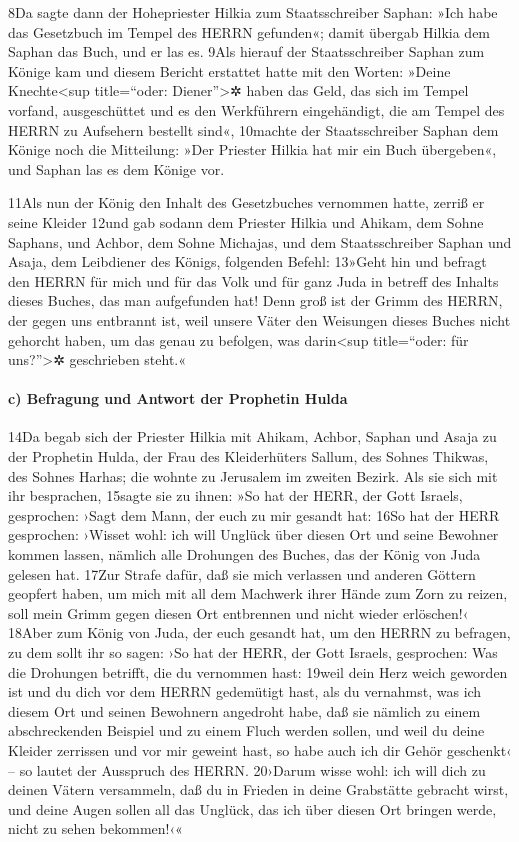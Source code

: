 8Da sagte dann der Hohepriester Hilkia zum Staatsschreiber Saphan: »Ich
habe das Gesetzbuch im Tempel des HERRN gefunden«; damit übergab Hilkia
dem Saphan das Buch, und er las es. 9Als hierauf der Staatsschreiber
Saphan zum Könige kam und diesem Bericht erstattet hatte mit den Worten:
»Deine Knechte\textless sup title=``oder: Diener''\textgreater✲ haben
das Geld, das sich im Tempel vorfand, ausgeschüttet und es den
Werkführern eingehändigt, die am Tempel des HERRN zu Aufsehern bestellt
sind«, 10machte der Staatsschreiber Saphan dem Könige noch die
Mitteilung: »Der Priester Hilkia hat mir ein Buch übergeben«, und Saphan
las es dem Könige vor.

11Als nun der König den Inhalt des Gesetzbuches vernommen hatte, zerriß
er seine Kleider 12und gab sodann dem Priester Hilkia und Ahikam, dem
Sohne Saphans, und Achbor, dem Sohne Michajas, und dem Staatsschreiber
Saphan und Asaja, dem Leibdiener des Königs, folgenden Befehl: 13»Geht
hin und befragt den HERRN für mich und für das Volk und für ganz Juda in
betreff des Inhalts dieses Buches, das man aufgefunden hat! Denn groß
ist der Grimm des HERRN, der gegen uns entbrannt ist, weil unsere Väter
den Weisungen dieses Buches nicht gehorcht haben, um das genau zu
befolgen, was darin\textless sup title=``oder: für uns?''\textgreater✲
geschrieben steht.«

\hypertarget{c-befragung-und-antwort-der-prophetin-hulda}{%
\paragraph{c) Befragung und Antwort der Prophetin
Hulda}\label{c-befragung-und-antwort-der-prophetin-hulda}}

14Da begab sich der Priester Hilkia mit Ahikam, Achbor, Saphan und Asaja
zu der Prophetin Hulda, der Frau des Kleiderhüters Sallum, des Sohnes
Thikwas, des Sohnes Harhas; die wohnte zu Jerusalem im zweiten Bezirk.
Als sie sich mit ihr besprachen, 15sagte sie zu ihnen: »So hat der HERR,
der Gott Israels, gesprochen: ›Sagt dem Mann, der euch zu mir gesandt
hat: 16So hat der HERR gesprochen: ›Wisset wohl: ich will Unglück über
diesen Ort und seine Bewohner kommen lassen, nämlich alle Drohungen des
Buches, das der König von Juda gelesen hat. 17Zur Strafe dafür, daß sie
mich verlassen und anderen Göttern geopfert haben, um mich mit all dem
Machwerk ihrer Hände zum Zorn zu reizen, soll mein Grimm gegen diesen
Ort entbrennen und nicht wieder erlöschen!‹ 18Aber zum König von Juda,
der euch gesandt hat, um den HERRN zu befragen, zu dem sollt ihr so
sagen: ›So hat der HERR, der Gott Israels, gesprochen: Was die Drohungen
betrifft, die du vernommen hast: 19weil dein Herz weich geworden ist und
du dich vor dem HERRN gedemütigt hast, als du vernahmst, was ich diesem
Ort und seinen Bewohnern angedroht habe, daß sie nämlich zu einem
abschreckenden Beispiel und zu einem Fluch werden sollen, und weil du
deine Kleider zerrissen und vor mir geweint hast, so habe auch ich dir
Gehör geschenkt‹ -- so lautet der Ausspruch des HERRN. 20›Darum wisse
wohl: ich will dich zu deinen Vätern versammeln, daß du in Frieden in
deine Grabstätte gebracht wirst, und deine Augen sollen all das Unglück,
das ich über diesen Ort bringen werde, nicht zu sehen bekommen!‹«

